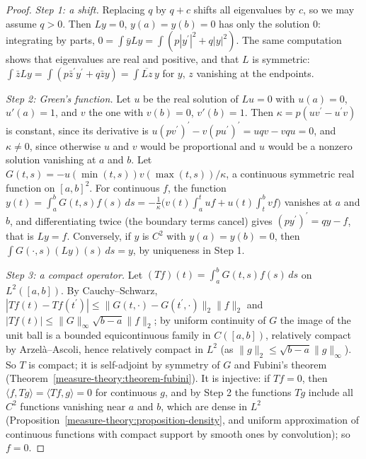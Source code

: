 \begin{proof}
\emph{Step 1: a shift.} Replacing $q$ by $q + c$ shifts all eigenvalues by $c$, so we may assume $q > 0$. Then $Ly = 0$, $y(a) = y(b) = 0$ has only the solution $0$: integrating by parts, $0 = \int\bar yLy = \int(p|y^{\prime}|^2 + q|y|^2)$. The same
computation shows that eigenvalues are real and positive, and that $L$ is symmetric: $\int\bar zLy = \int(p\bar z^{\prime}y^{\prime} + q\bar zy) = \int\overline{Lz}\,y$ for $y$, $z$ vanishing at the endpoints.

\emph{Step 2: Green's function.} Let $u$ be the real solution of $Lu = 0$ with $u(a) = 0$, $u'(a) = 1$, and $v$ the one with $v(b) = 0$, $v'(b) = 1$. Then $\kappa = p(uv^{\prime} - u^{\prime}v)$ is constant, since its derivative is
$u(pv^{\prime})^{\prime} - v(pu^{\prime})^{\prime} = uqv - vqu = 0$, and $\kappa \neq 0$, since otherwise $u$ and $v$ would be proportional and $u$ would be a nonzero solution vanishing at $a$ and $b$. Let
$G(t, s) = -u(\min(t, s))v(\max(t, s))/\kappa$, a continuous symmetric real function on $[a, b]^2$. For continuous $f$, the function
$y(t) = \int_a^bG(t, s)f(s)\,ds = -\frac1\kappa\bigl(v(t)\int_a^tuf + u(t)\int_t^bvf\bigr)$ vanishes at $a$ and $b$, and differentiating twice (the boundary terms cancel) gives $(py^{\prime})^{\prime} = qy - f$, that is $Ly = f$.
Conversely, if $y$ is $C^2$ with $y(a) = y(b) = 0$, then $\int G(\cdot, s)(Ly)(s)\,ds = y$, by uniqueness in Step 1.

\emph{Step 3: a compact operator.} Let $(Tf)(t) = \int_a^bG(t, s)f(s)\,ds$ on $L^2([a, b])$. By Cauchy--Schwarz, $|Tf(t) - Tf(t^{\prime})| \leq \|G(t, \cdot) - G(t^{\prime}, \cdot)\|_2\|f\|_2$ and $|Tf(t)| \leq \|G\|_\infty\sqrt{b - a}\|f\|_2$; by uniform
continuity of $G$ the image of the unit ball is a bounded equicontinuous family in $C([a, b])$, relatively compact by Arzel\`a--Ascoli, hence relatively compact in $L^2$ (as $\|g\|_2 \leq \sqrt{b - a}\|g\|_\infty$). So $T$ is compact; it is
self-adjoint by symmetry of $G$ and Fubini's theorem (Theorem~\ref{measure-theory:theorem-fubini}). It is injective: if $Tf = 0$, then $\langle f, Tg\rangle = \langle Tf, g\rangle = 0$ for continuous $g$, and by Step 2 the functions $Tg$
include all $C^2$ functions vanishing near $a$ and $b$, which are dense in $L^2$ (Proposition~\ref{measure-theory:proposition-density}, and uniform approximation of continuous functions with compact support by smooth ones by
convolution); so $f = 0$.


\end{proof}
